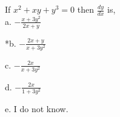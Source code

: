 
If \( x^{2} + xy + y^{3} = 0 \) then \( \frac{dy}{dx} \) is,\\

a. \( - \frac{ x + 3y^{2} }{ 2x + y } \)

*b. \( - \frac{ 2x + y }{ x + 3y^{2} } \)

c. \( - \frac{ 2x }{ x + 3y^{2} } \)

d. \( - \frac{ 2x }{ 1 + 3y^{2} } \)

e. I do not know.\\
